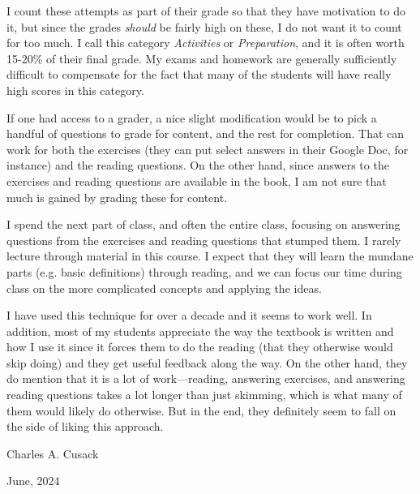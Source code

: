 I count these attempts as part of their grade so that they have motivation
to do it, but since the grades {\em should}
be fairly high on these, I do not want it to count for too much.
I call this category {\em Activities} or {\em Preparation}, and
it is often worth 15-20\% of their final grade. My exams and homework
are generally sufficiently difficult to compensate for the fact that many of 
the students will have really high scores in this category.

If one had access to a grader, a nice slight modification would be to
pick a handful of questions to grade for content, and the rest for completion.
That can work for both the exercises 
(they can put select answers in their Google Doc, for instance) 
and the reading questions. On the other hand, since 
answers to the exercises and reading questions are available in the book,
I am not sure that much is gained by grading these for content.

I spend the next part of class, and often the entire class, focusing
on answering questions from the exercises and reading questions that 
stumped them. 
I rarely lecture through material in this course. 
I expect that they will learn the mundane parts
(e.g. basic definitions) through reading, and we can
focus our time during class on the more complicated concepts and applying
the ideas. 

I have used this technique for over a decade and it seems to 
work well. In addition, most of my students appreciate the way the textbook 
is written and how I use it since it forces them to do the reading 
(that they otherwise would skip doing) and they 
get useful feedback along the way. On the other hand, they do mention 
that it is a lot of work---reading, answering exercises, and answering reading
questions takes a lot longer than just skimming, which is what many of them
would likely do otherwise. But in the end, they definitely seem to fall on 
the side of liking this approach.

\bigskip

\noindent
Charles A. Cusack

\noindent
June, 2024


\newpage
{}

\bigskip

